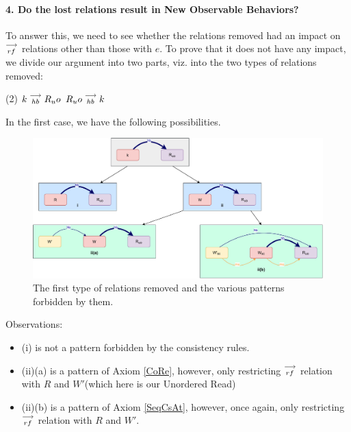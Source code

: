 \paragraph{4. Do the lost relations result in New Observable Behaviors?}

        To answer this, we need to see whether the relations removed had an impact on $\stackrel{\longrightarrow}{_{rf}}$ relations other than those with $e$. To prove that it does not have any impact, we divide our argument into two parts, viz. into the two types of relations removed:

        \begin{tasks}(2)
            \task $k\stackrel{\longrightarrow}{_{hb}}R_uo$ 
            \task $R_uo\stackrel{\longrightarrow}{_{hb}}k$ 
        \end{tasks}

        In the first case, we have the following possibilities. 
        \begin{figure}[H]
            \centering
            \includegraphics[scale=0.5]{Elimination/1.ValidEliminationCandidate/ReadElimProof/ProofParts/Part4_Case1.pdf}
            \caption{The first type of relations removed and the various patterns forbidden by them.}
        \end{figure}

        Observations:
        \begin{itemize}
            \item (i) is not a pattern forbidden by the consistency rules.
            \item (ii)(a) is a pattern of Axiom \ref{CoRe}, however, only restricting $\stackrel{\longrightarrow}{_{rf}}$ relation with $R$ and $W'$(which here is our Unordered Read)
            \item (ii)(b) is a pattern of Axiom \ref{SeqCsAt}, however, once again, only restricting $\stackrel{\longrightarrow}{_{rf}}$ relation with $R$ and $W'$. 
        \end{itemize}

